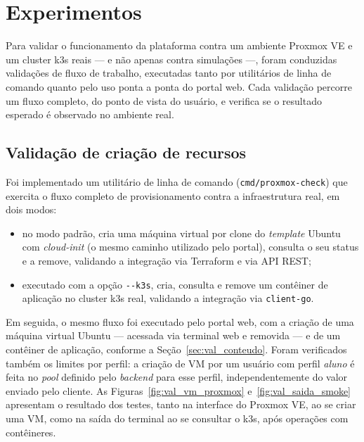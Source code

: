 \chapter{Experimentos}
\label{chapter:experimentos}

Para validar o funcionamento da plataforma contra um ambiente Proxmox VE e um cluster k3s reais — e não apenas contra simulações —, foram conduzidas validações de fluxo de trabalho, executadas tanto por utilitários de linha de comando quanto pelo uso ponta a ponta do portal web. Cada validação percorre um fluxo completo, do ponto de vista do usuário, e verifica se o resultado esperado é observado no ambiente real.

\section{Validação de criação de recursos}

Foi implementado um utilitário de linha de comando (\texttt{cmd/proxmox-check}) que exercita o fluxo completo de provisionamento contra a infraestrutura real, em dois modos:

\begin{itemize}
    \item no modo padrão, cria uma máquina virtual por clone do \textit{template} Ubuntu com \textit{cloud-init} (o mesmo caminho utilizado pelo portal), consulta o seu status e a remove, validando a integração via Terraform e via API REST;
    \item executado com a opção \texttt{-{}-k3s}, cria, consulta e remove um contêiner de aplicação no cluster k3s real, validando a integração via \texttt{client-go}.
\end{itemize}

\par Em seguida, o mesmo fluxo foi executado pelo portal web, com a criação de uma máquina virtual Ubuntu — acessada via terminal web e removida — e de um contêiner de aplicação, conforme a Seção~\ref{sec:val_conteudo}. Foram verificados também os limites por perfil: a criação de VM por um usuário com perfil \textit{aluno} é feita no \textit{pool} definido pelo \textit{backend} para esse perfil, independentemente do valor enviado pelo cliente. As Figuras~\ref{fig:val_vm_proxmox} e~\ref{fig:val_saida_smoke} apresentam o resultado dos testes, tanto na interface do Proxmox VE, ao se criar uma VM, como na saída do terminal ao se consultar o k3s, após operações com contêineres.


